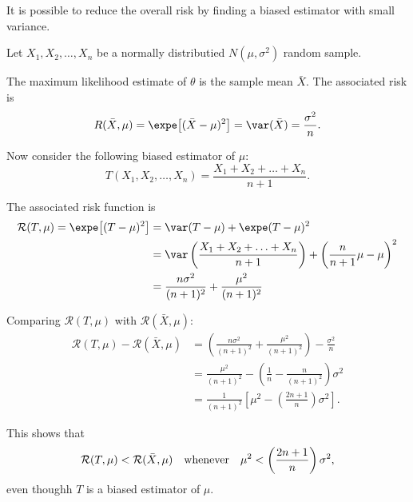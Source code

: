 It is possible to reduce the overall risk by finding a biased estimator with small variance.
\begin{example}
%
%
Let $X_1,X_2,\ldots,X_n$ be a normally distributied $N(\mu,\sigma^2)$ random sample. 

The maximum likelihood estimate of $\theta$ is the sample mean $\bar{X}$. The associated risk is
\[
R(\bar{X},\mu)  = \expe\big[(\bar{X}-\mu)^2\big] = \var(\bar{X}) = \frac{\sigma^2}{n}.
\]

Now consider the following biased estimator of $\mu$:
\[
T(X_1,X_2,\ldots,X_n) = \frac{X_1+X_2+\ldots+X_n}{n+1}.
\]

The associated risk function is
\begin{align*}
\mathcal{R}(T,\mu)
	= \expe\big[(T-\mu)^2\big] 
	& = \var(T-\mu) + \expe(T-\mu)^2 \\
	& = \var\left(\frac{X_1+X_2+\ldots+X_n}{n+1}\right) + \left(\frac{n}{n+1}\mu - \mu\right)^2 \\
	& = \frac{n\sigma^2}{(n+1)^2} + \frac{\mu^2}{(n+1)^2}
\end{align*}

Comparing $\mathcal{R}(T,\mu)$ with $\mathcal{R}(\bar{X},\mu)$:
\begin{align*}
\mathcal{R}(T,\mu) - \mathcal{R}(\bar{X},\mu)
	& = \left(\frac{n\sigma^2}{(n+1)^2} + \frac{\mu^2}{(n+1)^2}\right) - \frac{\sigma^2}{n} \\
	& = \frac{\mu^2}{(n+1)^2} - \left(\frac{1}{n} - \frac{n}{(n+1)^2}\right)\sigma^2 \\
	& = \frac{1}{(n+1)^2}\left[\mu^2 - \left(\frac{2n+1}{n}\right)\sigma^2\right].
\end{align*}

This shows that 
\[
\mathcal{R}(T,\mu) < \mathcal{R}(\bar{X},\mu) \text{\quad whenever\quad} \mu^2 < \left(\frac{2n+1}{n}\right)\sigma^2,
\]
\vspace{-2ex}
even thoughh $T$ is a biased estimator of $\mu$.
\end{example}


%
%
%
\stopcontents[chapters]
\endinput
